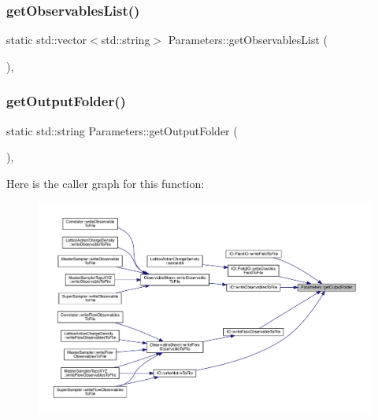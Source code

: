 \subsubsection{\texorpdfstring{getObservablesList()}{getObservablesList()}}
{\footnotesize\ttfamily static std\+::vector$<$std\+::string$>$ Parameters\+::get\+Observables\+List (\begin{DoxyParamCaption}{ }\end{DoxyParamCaption})\hspace{0.3cm}{\ttfamily [inline]}, {\ttfamily [static]}}

\mbox{\label{class_parameters_afa4cfe5dc4302b1e8f8928606ea9b056}} 
\subsubsection{\texorpdfstring{getOutputFolder()}{getOutputFolder()}}
{\footnotesize\ttfamily static std\+::string Parameters\+::get\+Output\+Folder (\begin{DoxyParamCaption}{ }\end{DoxyParamCaption})\hspace{0.3cm}{\ttfamily [inline]}, {\ttfamily [static]}}

Here is the caller graph for this function\+:
\nopagebreak
\begin{figure}[H]
\begin{center}
\leavevmode
\includegraphics[width=350pt]{class_parameters_afa4cfe5dc4302b1e8f8928606ea9b056_icgraph}
\end{center}
\end{figure}
\mbox{\label{class_parameters_a778a2311c27854392c34c15bd4ea19f8}} 
